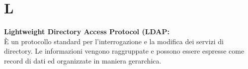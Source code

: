 \section{L}
\textbf{Lightweight Directory Access Protocol (LDAP:}\\
È un protocollo standard per l'interrogazione e la modifica dei servizi di directory. Le informazioni vengono raggruppate e possono essere espresse come record di dati ed organizzate in maniera gerarchica.

\clearpage